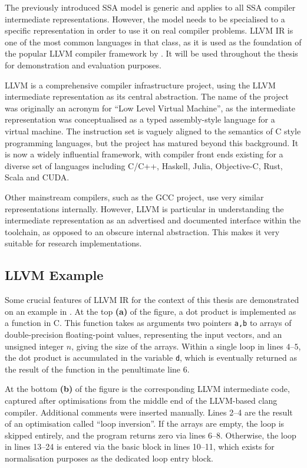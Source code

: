     The previously introduced SSA model is generic and applies to all SSA
    compiler intermediate representations.
    However, the model needs to be specialised to a specific representation in
    order to use it on real compiler problems.
    LLVM IR is one of the most common languages in that class, as it is
    used as the foundation of the popular LLVM compiler framework by
    \citet{lattner2004llvm}.
    It will be used throughout the thesis for demonstration and evaluation
    purposes.

    LLVM is a comprehensive compiler infrastructure project, using the LLVM
    intermediate representation as its central abstraction.
    The name of the project was originally an acronym for
    ``Low Level Virtual Machine'', as the intermediate representation was
    conceptualised as a typed assembly-style language for a virtual machine.
    The instruction set is vaguely aligned to the semantics of C style
    programming languages, but the project has matured beyond this background.
    It is now a widely influential framework, with compiler front ends existing
    for a diverse set of languages including C/C++, Haskell, Julia, Objective-C,
    Rust, Scala and CUDA.

    Other mainstream compilers, such as the GCC project, use very similar
    representations internally.
    However, LLVM is particular in understanding the intermediate
    representation as an advertised and documented interface within the
    toolchain, as opposed to an obscure internal abstraction.
    This makes it very suitable for research implementations.

\subsection{LLVM Example}

    Some crucial features of LLVM IR for the context of this thesis are
    demonstrated on an example in .
    At the top {\bf (a)} of the figure, a dot product is implemented as a
    function in C.
    This function takes as arguments two pointers {\tt a,b} to arrays of
    double-precision floating-point values, representing the input vectors, and
    an unsigned integer $n$, giving the size of the arrays.
    Within a single loop in lines $4$--$5$, the dot product is accumulated in
    the variable {\tt d}, which is eventually returned as the result of the
    function in the penultimate line $6$.

    At the bottom {\bf (b)} of the figure is the corresponding LLVM intermediate
    code, captured after optimisations from the middle end of the LLVM-based
    clang compiler.
    Additional comments were inserted manually.
    Lines 2--4 are the result of an optimisation called ``loop inversion''.
    If the arrays are empty, the loop is skipped entirely, and the program
    returns zero via lines 6--8.
    Otherwise, the loop in lines 13--24 is entered via the basic block in lines
    10--11, which exists for normalisation purposes as the dedicated loop entry
    block.

